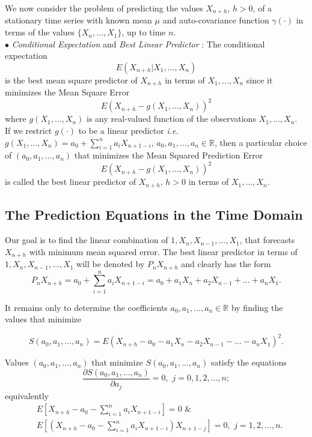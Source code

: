 \documentclass[11pt, a4paper]{article}
\numberwithin{equation}{section}
\theoremstyle{definition}
\begin{document}
We now consider the problem of predicting the values $X_{n+h}, \, h > 0$, of a stationary time series with known mean $\mu$ and auto-covariance function $\gamma(\cdot)$ in terms of the values $\{X_n, \ldots, X_1\}$, up to time $n$. \\[0.25em]

$\bullet$ \textit{Conditional Expectation} and \textit{Best Linear Predictor} : The conditional expectation $$E(X_{n+h} | X_1, \ldots, X_n)$$ is the best mean square predictor of $X_{n+h}$ in terms of $X_1, \ldots, X_n$ since it minimizes the Mean Square Error $$E\left(X_{n+h} - g(X_1, \ldots, X_n) \right)^2$$ where $g(X_1, \ldots, X_n)$ is any real-valued function of the observations $X_1, \ldots, X_n$. \\[0.25em]

If we restrict $g(\cdot)$ to be a linear predictor \textit{i.e.} $g(X_1, \ldots, X_n) = a_0 + \sum \limits_{i = 1}^{n}a_i X_{n+1-i}, \, a_0, a_1, \ldots, a_n \in \mathbb{R}$, then a particular choice of $(a_0, a_1, \ldots, a_n)$ that minimizes the Mean Squared Prediction Error $$E\left(X_{n+h} - g(X_1, \ldots, X_n) \right)^2$$ is called the best linear predictor of $X_{n+h}, \, h > 0$ in terms of $X_1, \ldots, X_n$. \\ [0.25em]

\subsection{The Prediction Equations in the Time Domain}

Our goal is to find the linear combination of $1,X_n,X_{n-1}, \ldots, X_1$, that forecasts $X_{n+h}$ with minimum mean squared error. The best linear predictor in terms of $1,X_n,X_{n-1}, \ldots, X_1$ will be denoted by $P_n X_{n+h}$ and clearly has the form $$P_n X_{n+h} = a_0 + \sum \limits_{i = 1}^{n}a_i X_{n+1-i} = a_0 + a_1 X_n + a_2 X_{n-1} + \ldots + a_n X_1.$$

It remains only to determine the coefficients $a_0, a_1, \ldots, a_n \in \mathbb{R}$ by finding the values that minimize

\begin{equation}
S(a_0, a_1, \ldots, a_n) = E(X_{n+h} - a_0 - a_1 X_n - a_2 X_{n-1} - \ldots - a_n X_1)^2.
\end{equation}

Values $(a_0, a_1, \ldots, a_n)$ that minimize $S(a_0, a_1, \ldots, a_n)$ satisfy the equations
\begin{equation}
\dfrac{\partial S(a_0, a_1, \ldots, a_n)}{\partial a_j} = 0, \,\, j = 0, 1, 2, \ldots, n;
\end{equation}
equivalently
\begin{align}
&E\left[ X_{n+h} - a_0 - \sum \limits_{i = 1}^{n}a_i X_{n+1-i} \right] = 0 \label{forecastingstationarynormaleq1} \,\, \& \\[0.3em]
&E\left[ \left( X_{n+h} - a_0 - \sum \limits_{i = 1}^{n}a_i X_{n+1-i} \right) X_{n+1-j} \right] = 0, \label{forecastingstationarynormaleqrest} \,\, j = 1, 2, \ldots, n.
\end{align}
\end{document}
